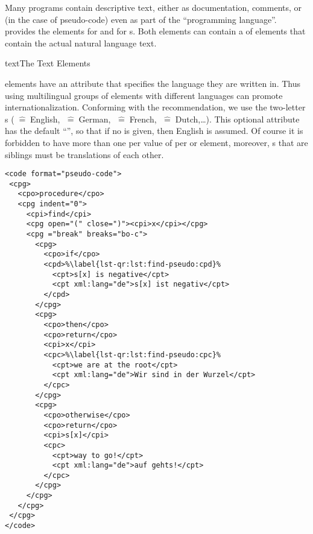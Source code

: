Many programs contain descriptive text, either as documentation, comments, or (in
the case of pseudo-code) even as part of the ``programming language''. {\codeml}
provides the elements {} for {} and {} for {s}.
Both elements can contain a {} of {} elements that contain the
actual natural language text. 

\begin{myfig}{text}{The {\codeml} Text Elements}
  \quicktable{\texttable{}}
\end{myfig}

{} elements have an {} attribute that specifies the
language they are written in. Thus using multilingual groups of
{} elements with different languages can promote {\codeml}
internationalization.  Conforming with the {\xml} recommendation, we use the
{} two-letter {s}
({}$\;\widehat=\;$English, {}$\;\widehat=\;$German,
{}$\;\widehat=\;$French, {}$\;\widehat=\;$Dutch,\ldots).  This
optional attribute has the default ``{}'', so that if no
{} is given, then English is assumed. Of course it is
forbidden to have more than one {} per value of
{} per {} or {} element,
moreover, {}s that are siblings must be translations of each other.

\begin{lstlisting}[float,frame=lines,label=lst:find-pseudo,escapechar=\%,
   caption={Pseudo-code for the code snippet in {\mylstref{find-raw}}},
   index={[2]cpc,cpd,cpt}]
 <code format="pseudo-code">
 <cpg>
   <cpo>procedure</cpo>
   <cpg indent="0">
     <cpi>find</cpi>
     <cpg open="(" close=")"><cpi>x</cpi></cpg>
     <cpg ="break" breaks="bo-c">
       <cpg>
         <cpo>if</cpo>
         <cpd>%\label{lst-qr:lst:find-pseudo:cpd}%
           <cpt>s[x] is negative</cpt>
           <cpt xml:lang="de">s[x] ist negativ</cpt>
         </cpd>
       </cpg>
       <cpg>
         <cpo>then</cpo>
         <cpo>return</cpo>
         <cpi>x</cpi>
         <cpc>%\label{lst-qr:lst:find-pseudo:cpc}%
           <cpt>we are at the root</cpt>
           <cpt xml:lang="de">Wir sind in der Wurzel</cpt>
         </cpc>
       </cpg>
       <cpg>
         <cpo>otherwise</cpo>
         <cpo>return</cpo>
         <cpi>s[x]</cpi>
         <cpc>
           <cpt>way to go!</cpt>
           <cpt xml:lang="de">auf gehts!</cpt>
         </cpc>
       </cpg>
     </cpg>
   </cpg>
 </cpg>
</code>
\end{lstlisting}

